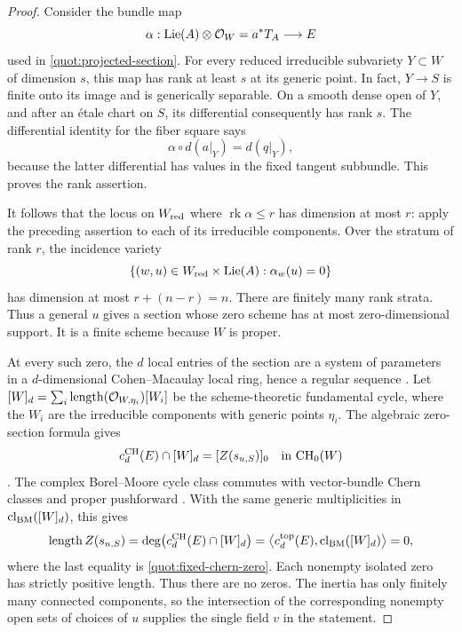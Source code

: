 \begin{proof}
Consider the bundle map
\[
      \alpha:\operatorname{Lie}(A)\otimes\mathcal O_W
           =a^*T_A\longrightarrow E
\]
used in \eqref{quot:projected-section}.
For every reduced irreducible subvariety \(Y\subset W\) of dimension
\(s\), this map has rank at least \(s\) at its generic point.
In fact, \(Y\to S\) is finite onto its image and is generically
separable.  On a smooth dense open of \(Y\), and after an étale chart
on \(S\), its differential consequently has rank \(s\).
The differential identity for the fiber square says
\[
                     \alpha\circ d(a|_Y)=d(q|_Y),
\]
because the latter differential has values in the fixed tangent
subbundle.  This proves the rank assertion.

It follows that the locus on \(W_{\rm red}\) where
\(\operatorname{rk}\alpha\le r\) has dimension at most \(r\):
apply the preceding assertion to each of its irreducible components.
Over the stratum of rank \(r\), the incidence variety
\[
 \{(w,u)\in W_{\rm red}\times\operatorname{Lie}(A):
                                             \alpha_w(u)=0\}
\]
has dimension at most \(r+(n-r)=n\).
There are finitely many rank strata.  Thus a general \(u\) gives a
section whose zero scheme has at most zero-dimensional support.
It is a finite scheme because \(W\) is proper.

At every such zero, the \(d\) local entries of the section are a
system of parameters in a \(d\)-dimensional Cohen--Macaulay local ring,
hence a regular sequence \cite[Tag 02JN]{StacksProject}.
Let \([W]_d=\sum_i\operatorname{length}(\mathcal O_{W,\eta_i})[W_i]\)
be the scheme-theoretic fundamental cycle, where the \(W_i\) are the
irreducible components with generic points \(\eta_i\).  The algebraic
zero-section formula gives
\[
       c_d^{\rm CH}(E)\cap[W]_d=[Z(s_{u,S})]_0
                              \quad\hbox{in }\mathrm{CH}_0(W)
\]
\cite[Tag 0FA9]{StacksProject}.  The complex Borel--Moore cycle class commutes with
vector-bundle Chern classes and proper pushforward
\cite[Chapter~19]{Fulton1998}.  With the same generic multiplicities
in \(\operatorname{cl}_{\rm BM}([W]_d)\), this gives
\[
 \operatorname{length} Z(s_{u,S})
   =\deg\bigl(c_d^{\rm CH}(E)\cap[W]_d\bigr)
   =\bigl\langle c_d^{\rm top}(E),
                  \operatorname{cl}_{\rm BM}([W]_d)\bigr\rangle=0,
\]
where the last equality is \eqref{quot:fixed-chern-zero}.  Each
nonempty isolated zero has strictly positive length.
Thus there are no zeros.
The inertia has only finitely many connected components, so the
intersection of the corresponding nonempty open sets of choices of
\(u\) supplies the single field \(v\) in the statement.
\end{proof}

